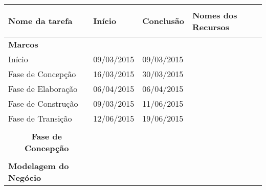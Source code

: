 \begin{table}[h]
\begin{tabular}{llll}
\hline
\hypertarget{tarefasPlanoIteracao}{\textbf{Nome da tarefa}}                         & \textbf{Início} & \textbf{Conclusão} & \textbf{Nomes dos Recursos}                                                                             \\ \hline
\textbf{Marcos}                                 &                 &                    &                                                                                                         \\
Início                                          & 09/03/2015      & 09/03/2015         &                                                                                                         \\
Fase de Concepção                               & 16/03/2015      & 30/03/2015         &                                                                                                         \\
Fase de Elaboração                              & 06/04/2015      & 06/04/2015         &                                                                                                         \\
Fase de Construção                              & 09/03/2015      & 11/06/2015         &                                                                                                         \\
Fase de Transição                               & 12/06/2015      & 19/06/2015         &                                                                                                         \\
                                                &                 &                    &                                                                                                         \\
\multicolumn{1}{c}{\textbf{Fase de Concepção}}  &                 &                    &                                                                                                         \\
                                                &                 &                    &                                                                                                         \\
\textbf{Modelagem do Negócio}                   &                 &                    &                                                                                                         \\

\end{tabular}
\end{table}
